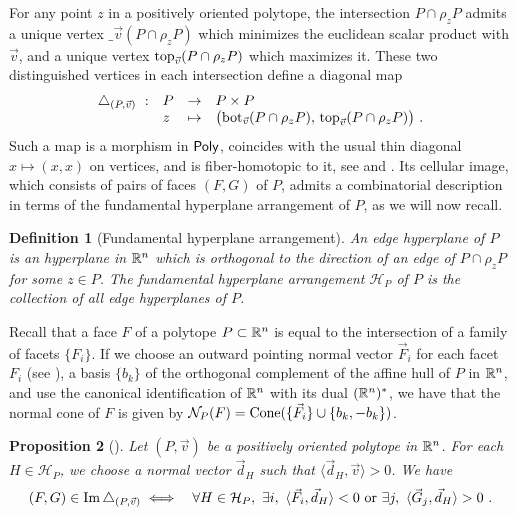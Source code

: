 \documentclass[10pt]{amsart}
\newtheorem{definition}{Definition}[section]
\newtheorem{proposition}[definition]{Proposition}
\theoremstyle{remark}
\begin{document}
For any point $z$ in a positively oriented polytope, the intersection $P \cap \rho_z P$ admits a unique vertex $\bm_{\vec v}(P \cap \rho_z P)$ which minimizes the euclidean scalar product with $\vec v$, and a unique vertex $\operatorname{top}_{\vec v}(P \cap \rho_z P)$ which maximizes it. These two distinguished vertices in each intersection define a diagonal map
\begin{align*}
\begin{array}{rlcl}
\triangle_{(P,\vec v)}\  : & P &\to  &P \times P\\
&z & \mapsto& 
\bigl(\operatorname{bot}_{\vec v}(P\cap \rho_zP),\,  \operatorname{top}_{\vec v}(P\cap \rho_z P)\bigr) \ .
\end{array}
\end{align*}
Such a map is a morphism in $\mathsf{Poly}$, coincides with the usual thin diagonal $x\mapsto (x, x)$ on vertices, and is fiber-homotopic to it, see \cite[Proposition~5]{MTTV19} and \cite[Proposition 1.1]{LA21}.
Its cellular image, which consists of pairs of faces $(F,G)$ of $P$, admits a combinatorial description in terms of the fundamental hyperplane arrangement of $P$, as we will now recall.

\begin{definition}[Fundamental hyperplane arrangement]
  \label{def:fundamentalhyperplane} 
  An \emph{edge hyperplane} of $P$ is an hyperplane in $\mathbb{R}^n$ which is orthogonal to the direction of an edge of $P\cap\rho_z P$ for some $z \in P$.
  The \emph{fundamental hyperplane arrangement} $\mathcal{H}_P$ of $P$ is the collection of all edge hyperplanes of $P$. 
\end{definition}

Recall that a face $F$ of a polytope $P \subset \mathbb{R}^n$ is equal to the intersection of a family of facets $\{F_i\}$. 
If we choose an outward pointing normal vector $\vec F_i$ for each facet $F_i$ (see \cite[Definition 1.25]{LA21}), a basis $\{b_k\}$ of the orthogonal complement of the affine hull of $P$ in $\mathbb{R}^n$, and use the canonical identification of $\mathbb{R}^n$ with its dual $(\mathbb{R}^n)^{*}$, we have that the normal cone of $F$ is given by $\mathcal{N}_P(F)=\operatorname{Cone}(\{\vec F_i\} \cup \{b_k,-b_k\})$. 

\begin{proposition}[{\cite[Theorem 1.26]{LA21}}]
  \label{thm:universalformula} 
  Let $(P,\vec v)$ be a positively oriented polytope in $\mathbb{R}^n$. For each $H\in\mathcal{H}_P$, we choose a normal vector $\vec d_H$ such that $\langle \vec d_H, \vec v \rangle >0$. We have 
\begin{eqnarray*}
  (F,G) \in \operatorname{Im} \triangle_{(P,\vec v)} 
  &\iff&  \forall H \in \mathcal{H}_P , \ \exists i , \ \langle \vec F_i, \vec d_H \rangle < 0  \text{ or } \exists j , \ \langle \vec G_j, \vec d_H \rangle > 0 \ . 
\end{eqnarray*} 
\end{proposition}
\end{document}
